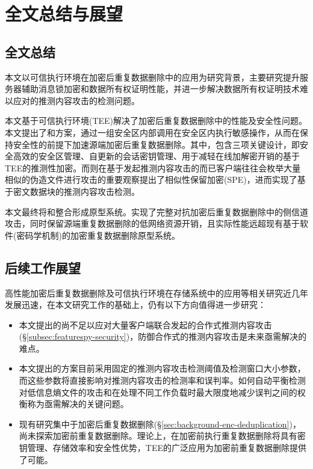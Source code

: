 \chapter{全文总结与展望}

\section{全文总结}

本文以可信执行环境在加密后重复数据删除中的应用为研究背景，主要研究提升服务器辅助消息锁加密和数据所有权证明性能，并进一步解决数据所有权证明技术难以应对的推测内容攻击的检测问题。

本文基于可信执行环境(TEE)解决了加密后重复数据删除中的性能及安全性问题。本文提出了\sysnameS 和\sysnameF 方案，通过一组安全区内部调用在安全区内执行敏感操作，从而在保持安全性的前提下加速源端加密后重复数据删除。其中，\sysnameS 包含三项关键设计，即安全高效的安全区管理、自更新的会话密钥管理、用于减轻在线加解密开销的基于TEE的推测性加密。而\sysnameF 则在基于发起推测内容攻击的而已客户端往往会枚举大量相似的伪造文件进行攻击的重要观察提出了相似性保留加密(SPE)，进而实现了基于密文数据块的推测内容攻击检测。

本文最终将\sysnameS 和\sysnameF 整合形成\prototype 原型系统。实现了完整对抗加密后重复数据删除中的侧信道攻击，同时保留源端重复数据删除的低网络资源开销，且实际性能远超现有基于软件(密码学机制)的加密重复数据删除原型系统。

\section{后续工作展望}

高性能加密后重复数据删除及可信执行环境在存储系统中的应用等相关研究近几年发展迅速，在本文研究工作的基础上，仍有以下方向值得进一步研究：

\begin{itemize}[leftmargin=0em]
    \item 本文提出的\sysnameF 尚不足以应对大量客户端联合发起的合作式推测内容攻击(\S\ref{subsec:featurespy-security})，防御合作式的推测内容攻击是未来亟需解决的难点。
    \item 本文提出的\sysnameF 方案目前采用固定的推测内容攻击检测阈值及检测窗口大小参数，而这些参数将直接影响对推测内容攻击的检测率和误判率。如何自动平衡检测对低信息熵文件的攻击和在处理不同工作负载时最大限度地减少误判之间的权衡称为亟需解决的关键问题。
    \item 现有研究集中于加密后重复数据删除(\S\ref{sec:background-enc-deduplication})，尚未探索加密前重复数据删除。理论上，在加密前执行重复数据删除将具有密钥管理、存储效率和安全性优势，TEE的广泛应用为加密前重复数据删除提供了可能。
\end{itemize}
